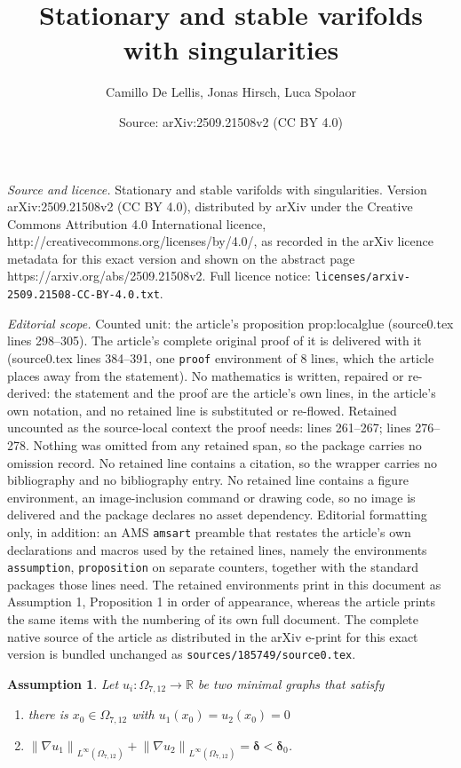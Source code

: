 \documentclass[10pt,a4paper]{amsart}
\title{Stationary and stable varifolds with singularities}
\author{Camillo De Lellis, Jonas Hirsch, Luca Spolaor}
\date{Source: arXiv:2509.21508v2 (CC BY 4.0)}
\newtheorem{assumption}{Assumption}
\newcommand{\R}{\mathbb{R}}
\newcommand{\norm}[1]{\left\lVert#1\right\rVert}
\begin{document}
\maketitle

\noindent\emph{Source and licence.} Stationary and stable varifolds with singularities. Version arXiv:2509.21508v2 (CC BY 4.0), distributed by arXiv under the Creative Commons Attribution 4.0 International licence, http://creativecommons.org/licenses/by/4.0/, as recorded in the arXiv licence metadata for this exact version and shown on the abstract page https://arxiv.org/abs/2509.21508v2. Full licence notice: \texttt{licenses/arxiv-2509.21508-CC-BY-4.0.txt}.\par\smallskip

\noindent\textit{Editorial scope.} Counted unit: the article's proposition prop:localglue (source0.tex lines 298--305). The article's complete original proof of it is delivered with it (source0.tex lines 384--391, one \texttt{proof} environment of 8 lines, which the article places away from the statement). No mathematics is written, repaired or re-derived: the statement and the proof are the article's own lines, in the article's own notation, and no retained line is substituted or re-flowed.  Retained uncounted as the source-local context the proof needs: lines 261--267; lines 276--278.  Nothing was omitted from any retained span, so the package carries no omission record.  No retained line contains a citation, so the wrapper carries no bibliography and no bibliography entry.  No retained line contains a figure environment, an image-inclusion command or drawing code, so no image is delivered and the package declares no asset dependency.  Editorial formatting only, in addition: an AMS \texttt{amsart} preamble that restates the article's own declarations and macros used by the retained lines, namely the environments \texttt{assumption}, \texttt{proposition} on separate counters, together with the standard packages those lines need.  The retained environments print in this document as Assumption 1, Proposition 1 in order of appearance, whereas the article prints the same items with the numbering of its own full document.  The complete native source of the article as distributed in the arXiv e-print for this exact version is bundled unchanged as \texttt{sources/185749/source0.tex}.
\begin{assumption}\label{ass:glue}
Let $u_i\colon \Omega_{7,12}\to \R$ be two minimal graphs that satisfy
\begin{enumerate}[label=(A.\arabic*)]
    \item\label{assumption.graph1} there is $x_0 \in \Omega_{7,12}$ with $u_1(x_0)=u_2(x_0)=0$
    \item\label{assumption.graph2} $\norm{\nabla u_1}_{L^\infty(\Omega_{7,12})}+\norm{\nabla u_2}_{L^\infty(\Omega_{7,12})} = \boldsymbol{\delta}<\boldsymbol{\delta}_0$.
\end{enumerate}
\end{assumption}
\end{document}
